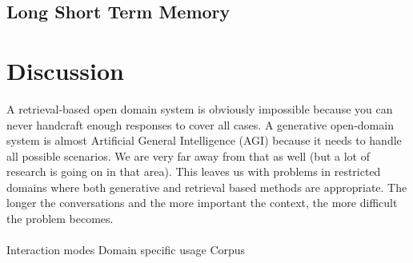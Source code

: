 \documentclass[letterpaper] {article} %
\begin{document}
\subsection{Long Short Term Memory}

\section{Discussion}
A retrieval-based open domain system is obviously impossible because you can never handcraft enough responses to cover all cases. A generative open-domain system is almost Artificial General Intelligence (AGI) because it needs to handle all possible scenarios. We are very far away from that as well (but a lot of research is going on in that area).
This leaves us with problems in restricted domains where both generative and retrieval based methods are appropriate. The longer the conversations and the more important the context, the more difficult the problem becomes.
\\\\
Interaction modes
Domain specific usage
Corpus

\newpage


\end{document}
